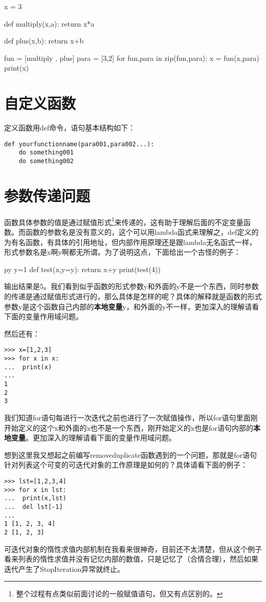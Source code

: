 \documentclass[12pt,oneside]{book}
\begin{document}
\begin{common-format}
\begin{tcbpython}[]
x = 3

def multiply(x,a):
    return x*a

def plus(x,b):
    return x+b

fun = [multiply , plus]
para = [3,2]
for fun,para in zip(fun,para):
    x = fun(x,para)
print(x)
\end{tcbpython}



\section{自定义函数}
定义函数用def命令，语句基本结构如下：
\begin{Verbatim}
def yourfunctionname(para001,para002...):
    do something001
    do something002
\end{Verbatim}



\section{参数传递问题}
函数具体参数的值是通过赋值形式\footnote{整个过程有点类似前面讨论的一般赋值语句，但又有点区别的。}来传递的，这有助于理解后面的不定变量函数。而函数的参数名是没有意义的，这个可以用lambda函式来理解之，def定义的为有名函数，有具体的引用地址，但内部作用原理还是跟lambda无名函式一样，形式参数名是x啊y啊都无所谓。为了说明这点，下面给出一个古怪的例子：

\begin{xverbatim}[129]{py}
y=1
def test(x,y=y):
    return x+y
print(test(4))
\end{xverbatim}

输出结果是5。我们看到似乎函数的形式参数y和外面的y不是一个东西，同时参数的传递是通过赋值形式进行的，那么具体是怎样的呢？具体的解释就是函数的形式参数y是这个函数自己内部的\textbf{本地变量}y，和外面的y不一样，更加深入的理解请看下面的变量作用域问题。

然后还有：
\begin{Verbatim}
>>> x=[1,2,3]
>>> for x in x:
...  print(x)
... 
1
2
3
\end{Verbatim}
我们知道for语句每进行一次迭代之前也进行了一次赋值操作，所以for语句里面刚开始定义的这个x和外面的x也不是一个东西，刚开始定义的x也是for语句内部的\textbf{本地变量}。更加深入的理解请看下面的变量作用域问题。

想到这里我又想起之前编写removeduplicate函数遇到的一个问题，那就是for语句针对列表这个可变的可迭代对象的工作原理是如何的？具体请看下面的例子：
\begin{Verbatim}
>>> lst=[1,2,3,4]
>>> for x in lst:
...  print(x,lst)
...  del lst[-1]
... 
1 [1, 2, 3, 4]
2 [1, 2, 3]
\end{Verbatim}
可迭代对象的惰性求值内部机制在我看来很神奇，目前还不太清楚，但从这个例子看来列表的惰性求值并没有记忆内部的数值，只是记忆了（合情合理），然后如果迭代产生了StopIteration异常就终止。




\end{common-format}
\end{document}
